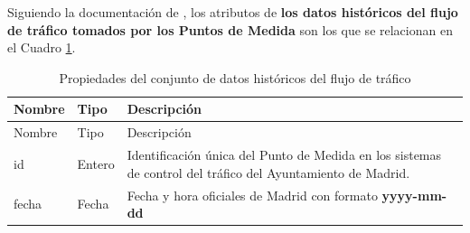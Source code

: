 \documentclass[]{book}
\begin{document}
Siguiendo la documentación de \citep{metrics2018madrid}, los atributos
de \textbf{los datos históricos del flujo de tráfico tomados por los
Puntos de Medida} son los que se relacionan en el Cuadro
\ref{tabs:propiedades-datos-flujo}.

\begin{longtable}[]{@{}lll@{}}
\caption{\label{tabs:propiedades-datos-flujo}Propiedades del conjunto de
datos históricos del flujo de tráfico}\tabularnewline
\toprule
\begin{minipage}[b]{0.26\columnwidth}\raggedright\strut
Nombre\strut
\end{minipage} & \begin{minipage}[b]{0.10\columnwidth}\raggedright\strut
Tipo\strut
\end{minipage} & \begin{minipage}[b]{0.52\columnwidth}\raggedright\strut
Descripción\strut
\end{minipage}\tabularnewline
\midrule
\endfirsthead
\toprule
\begin{minipage}[b]{0.26\columnwidth}\raggedright\strut
Nombre\strut
\end{minipage} & \begin{minipage}[b]{0.10\columnwidth}\raggedright\strut
Tipo\strut
\end{minipage} & \begin{minipage}[b]{0.52\columnwidth}\raggedright\strut
Descripción\strut
\end{minipage}\tabularnewline
\midrule
\endhead
\begin{minipage}[t]{0.26\columnwidth}\raggedright\strut
id\strut
\end{minipage} & \begin{minipage}[t]{0.10\columnwidth}\raggedright\strut
Entero\strut
\end{minipage} & \begin{minipage}[t]{0.52\columnwidth}\raggedright\strut
Identificación única del Punto de Medida en los sistemas de control del
tráfico del Ayuntamiento de Madrid.\strut
\end{minipage}\tabularnewline
\begin{minipage}[t]{0.26\columnwidth}\raggedright\strut
fecha\strut
\end{minipage} & \begin{minipage}[t]{0.10\columnwidth}\raggedright\strut
Fecha\strut
\end{minipage} & \begin{minipage}[t]{0.52\columnwidth}\raggedright\strut
Fecha y hora oficiales de Madrid con formato \textbf{yyyy-mm-dd
}
\end{minipage}
\end{longtable}
\end{document}
